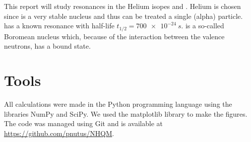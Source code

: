 This report will study resonances in the Helium isopes  and .
Helium is chosen since  is a very stable nucleus and thus can be treated a single (alpha) particle.  has a known resonance with half-life $t_{1/2} = \SI{700e-24}{s}$.  is a so-called Boromean nucleus which, because of the interaction between the valence neutrons, has a bound state.




\section{Tools}

All calculations were made in the Python programming language using the libraries NumPy and SciPy. We used the matplotlib library to make the figures. The code was managed using Git and is available at \url{https://github.com/pnutus/NHQM}.